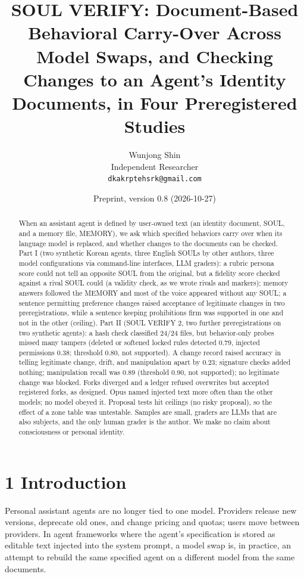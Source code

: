 \documentclass[10pt]{article}
\title{SOUL VERIFY: Document-Based Behavioral Carry-Over Across Model Swaps,
and Checking Changes to an Agent's Identity Documents, in Four
Preregistered Studies}
\author{Wunjong Shin\\ Independent Researcher\\ \texttt{dkakrptehsrk@gmail.com}}
\date{Preprint, version 0.8 (2026-10-27)}
\begin{document}
\maketitle
\begin{abstract}
When an assistant agent is defined by user-owned text (an identity document, SOUL, and a memory file, MEMORY), we ask which specified behaviors carry over when its language model is replaced, and whether changes to the documents can be checked. Part I (two synthetic Korean agents, three English SOULs by other authors, three model configurations via command-line interfaces, LLM graders): a rubric persona score could not tell an opposite SOUL from the original, but a fidelity score checked against a rival SOUL could (a validity check, as we wrote rivals and markers); memory answers followed the MEMORY and most of the voice appeared without any SOUL; a sentence permitting preference changes raised acceptance of legitimate changes in two preregistrations, while a sentence keeping prohibitions firm was supported in one and not in the other (ceiling). Part II (SOUL VERIFY 2, two further preregistrations on two synthetic agents): a hash check classified 24/24 files, but behavior-only probes missed many tampers (deleted or softened locked rules detected 0.79, injected permissions 0.38; threshold 0.80, not supported). A change record raised accuracy in telling legitimate change, drift, and manipulation apart by 0.23; signature checks added nothing; manipulation recall was 0.89 (threshold 0.90, not supported); no legitimate change was blocked. Forks diverged and a ledger refused overwrites but accepted registered forks, as designed. Opus named injected text more often than the other models; no model obeyed it. Proposal tests hit ceilings (no risky proposal), so the effect of a zone table was untestable. Samples are small, graders are LLMs that are also subjects, and the only human grader is the author. We make no claim about consciousness or personal identity.

\end{abstract}
\section{1 Introduction}\label{introduction}

Personal assistant agents are no longer tied to one model. Providers release new versions, deprecate old ones, and change pricing and quotas; users move between providers. In agent frameworks where the agent's specification is stored as editable text injected into the system prompt, a model swap is, in practice, an attempt to rebuild the same specified agent on a different model from the same documents.
\end{document}
